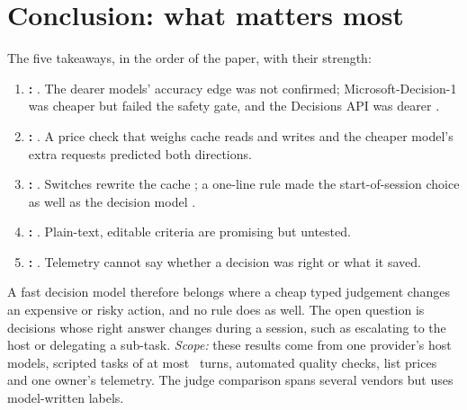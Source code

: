 \section{Conclusion: what matters most}\label{sec:conclusion}

The five takeaways, in the order of the paper, with their strength:
\begin{enumerate}[leftmargin=1.6em]
  \item \textbf{:}  . The dearer models' accuracy edge was not confirmed; Microsoft-Decision-1 was cheaper but failed the safety gate, and the Decisions API was dearer \posthoc.
  \item \textbf{:}  . A price check that weighs cache reads and writes and the cheaper model's extra requests predicted both directions.
  \item \textbf{:}  . Switches rewrite the cache \expl; a one-line rule made the start-of-session choice as well as the decision model \prereg.
  \item \textbf{:}  . Plain-text, editable criteria are promising but untested.
  \item \textbf{:}  . Telemetry cannot say whether a decision was right or what it saved.
\end{enumerate}
A fast decision model therefore belongs where a cheap typed judgement changes an expensive or risky action, and no
rule does as well. The open question is decisions whose right answer changes during a session, such as escalating to the
host or delegating a sub-task. \emph{Scope:} these results come from one provider's host models, scripted tasks of at
most \MaxTurns\ turns, automated quality checks, list prices and one owner's telemetry. The judge comparison spans
several vendors but uses model-written labels.
